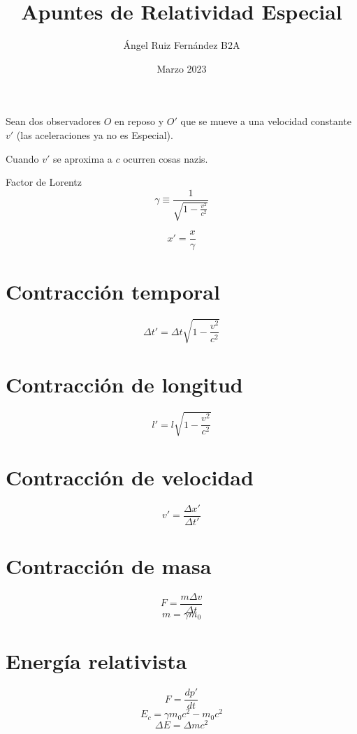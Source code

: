 \documentclass[12pt, letterpaper, twoside]{article}
\title{Apuntes de Relatividad Especial}
\author{Ángel Ruiz Fernández B2A}
\date{Marzo 2023}
\begin{document}
	\maketitle
	
	Sean dos observadores $O$ en reposo y $O'$ que se mueve a una velocidad constante $v'$ (las aceleraciones ya no es Especial).
	
	Cuando $v'$ se aproxima a $c$ ocurren cosas nazis.
	
	Factor de Lorentz
	\begin{equation}
		\gamma \equiv \frac{1}{\sqrt{1 - \frac{v^2}{c^2}}}
	\end{equation}

	\begin{equation}
		x' = \frac{x}{\gamma}
	\end{equation}
	
	\section{Contracción temporal}
	\begin{equation}
		\Delta t ' = \Delta t \sqrt{1 - \frac{v^2}{c^2}}
	\end{equation}

	\section{Contracción de longitud}
	\begin{equation}
		l ' = l \sqrt{1 - \frac{v^2}{c^2}}
	\end{equation}

	\section{Contracción de velocidad}
	\begin{equation}
		v ' = \frac{\Delta x'}{\Delta t'}
	\end{equation}

	\section{Contracción de masa}
	\begin{equation}
		F = \frac{m\Delta v}{\Delta t}
	\end{equation}
	\begin{equation}
		m = \gamma m_0
	\end{equation}

	\section{Energía relativista}
	\begin{equation}
		F = \frac{dp'}{dt}
	\end{equation}
	\begin{equation}
		E_c = \gamma m_0 c^2 - m_0 c^2
	\end{equation}
	\begin{equation}
		\Delta E = \Delta m c^2
	\end{equation}
	
	
\end{document}
